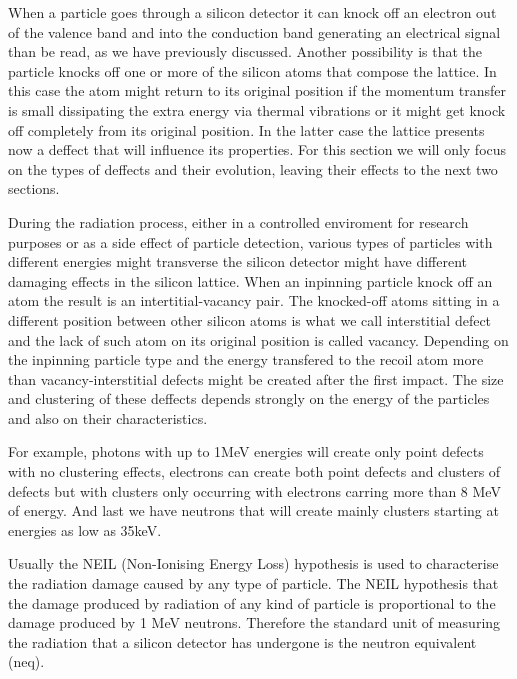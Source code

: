 When a particle goes through a silicon detector it can knock off an electron out of the valence band and into the conduction band generating an electrical signal than be read, as we have previously discussed. Another possibility is that the particle knocks off one or more of the silicon atoms that compose the lattice. In this case the atom might return to its original position if the momentum transfer is small dissipating the extra energy via thermal vibrations or it might get knock off completely from its original position. In the latter case the lattice presents now a deffect that will influence its properties. For this section we will only focus on the types of deffects and their evolution, leaving their effects to the next two sections. 

During the radiation process, either in a controlled enviroment for research purposes or as a side effect of particle detection, various types of particles with different energies might transverse the silicon detector might have different damaging effects in the silicon lattice. When an inpinning particle knock off an atom the result is an intertitial-vacancy pair. The knocked-off atoms sitting in a different position between other silicon atoms is what we call interstitial defect and the lack of such atom on its original position is called vacancy. Depending on the inpinning particle type and the energy transfered to the recoil atom more than vacancy-interstitial defects might be created after the first impact. The size and clustering of these deffects depends strongly on the energy of the particles and also on their characteristics. 

For example, photons with up to 1MeV energies will create only point defects with no clustering effects, electrons can create both point defects and clusters of defects but with clusters only occurring with electrons carring more than 8 MeV of energy. And last we have neutrons that will create mainly clusters starting at energies as low as 35keV. 

Usually the NEIL (Non-Ionising Energy Loss) hypothesis is used to characterise the radiation damage caused by any type of particle. The NEIL hypothesis that the damage produced by radiation of any kind of particle is proportional to the damage produced by 1 MeV neutrons. Therefore the standard unit of measuring the radiation that a silicon detector has undergone is the neutron equivalent (neq).

